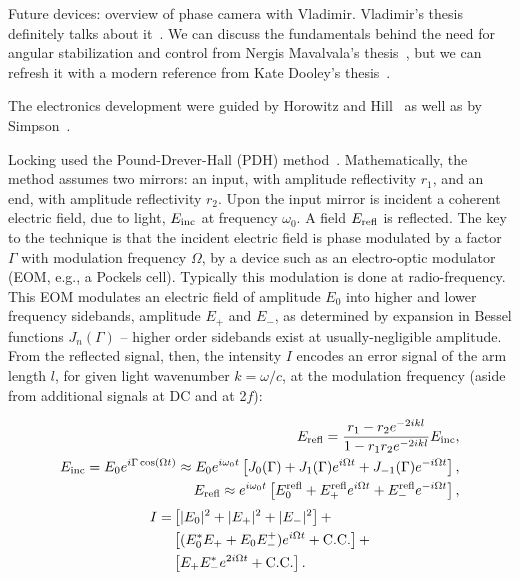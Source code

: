                    Future devices: overview of phase camera with Vladimir. Vladimir's thesis definitely talks about it~\cite{DergachevThesis}. We can discuss the fundamentals behind the need for angular stabilization and control from Nergis Mavalvala's thesis~\cite{MavalvalaThesis}, but we can refresh it with a modern reference from Kate Dooley's thesis~\cite{DooleyThesis}.

The electronics development were guided by Horowitz and Hill~\cite{HorowitzHill1989} as well as by Simpson~\cite{Simpson}.

Locking used the Pound-Drever-Hall (PDH) method~\cite{PDHNotes,MavalvalaThesis}.
Mathematically, the method assumes two mirrors: an input, with amplitude reflectivity $r_1$, and an end, with amplitude reflectivity $r_2$.
Upon the input mirror is incident a coherent electric field, due to light, $E_\textup{inc}$ at frequency $\omega_0$. A field $E_{\textup{refl}}$ is reflected.
The key to the technique is that the incident electric field is phase modulated by a factor $\Gamma$ with modulation frequency $\Omega$, by a device such as an electro-optic modulator (EOM, e.g., a Pockels cell).
Typically this modulation is done at radio-frequency.
This EOM modulates an electric field of amplitude $E_0$ into higher and lower frequency sidebands, amplitude $E_+$ and $E_-$, as determined by expansion in Bessel functions $J_n(\Gamma)$ -- higher order sidebands exist at usually-negligible amplitude.
From the reflected signal, then, the intensity $I$ encodes an error signal of the arm length $l$, for given light wavenumber $k = \omega / c$, at the modulation frequency (aside from additional signals at DC and at 2$f$):

\begin{eqnarray}
E_{\textup{refl}} = \frac{r_1 - r_2 e^{-2 i k l}}{1 - r_1 r_2 e^{-2 i k l}} E_\textup{inc},\\
E_\textup{inc} = E_0 e^{i \Gamma \cos \left( \Omega t \right)} \approx E_0 e^{i \omega_0 t} \left[ J_0 (\Gamma) + J_1 (\Gamma) e^{i\Omega t} + J_{-1} (\Gamma) e^{-i \Omega t} \right],\\
E_\textup{refl} \approx e^{i \omega_0 t} \left[ E_0^\textup{refl} + E_+^\textup{refl} e^{i\Omega t} + E_-^\textup{refl} e^{-i \Omega t}\right],
\end{eqnarray}
\begin{equation}
\begin{split}
I =& \left[ |E_0|^2 + |E_+|^2 + |E_-|^2\right] + \\ 
  & \left[(E_0^* E_+ + E_0 E^+_-)e^{i\Omega t} +\textup{C.C.} \right] + \\
  &\left[E_+ E_-^* e^{2i\Omega t} +\textup{C.C.} \right].
\end{split}
\end{equation}

